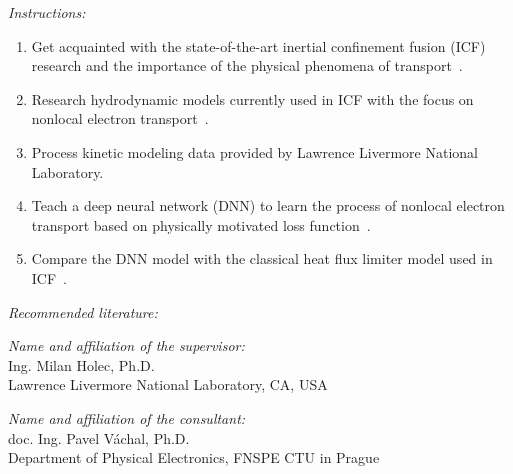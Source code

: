 \documentclass[11pt,a4paper]{article}
\begin{document}
{\it Instructions:}

\vspace{3ex}

\begin{enumerate}
\item
  Get acquainted with the state-of-the-art inertial confinement fusion (ICF)
  research and the importance of the physical phenomena of
  transport~\cite{lit:Abu-Shawareb_etal-PRL:22,lit:Casey_etal-PRL:21,lit:Rosen_etal-HEDP:11}.
\item
  Research hydrodynamic models currently used in ICF with the focus on nonlocal
  electron transport~\cite{lit:Holec_Nikl_Weber-PoP:18}.
\item
  Process kinetic modeling data provided by Lawrence Livermore National Laboratory.
\item
  Teach a deep neural network (DNN) to learn the process of nonlocal electron
  transport based on physically motivated loss
  function~\cite{lit:PyToTut,lit:PyToInt,lit:PyToReg}.
\item
  Compare the DNN model with the classical heat flux limiter model used
  in ICF~\cite{lit:Chapman_etal-PoP:21}.
\end{enumerate}



\vspace{2ex}

\newpage

{\it Recommended literature:}
\vspace{1ex}


%

%
%
%


\vspace{4ex}

{\it Name and affiliation of the supervisor:}\\[1mm]
Ing. Milan Holec, Ph.D.\\[1mm]
Lawrence Livermore National Laboratory, CA, USA

\vspace{3ex}

{\it Name and affiliation of the consultant:}\\[1mm]
doc. Ing. Pavel Váchal, Ph.D. \\[1mm]
Department of Physical Electronics, FNSPE CTU in Prague

\vspace{3ex}
\end{document}
